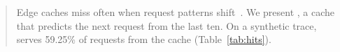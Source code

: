 \begin{abstract}
Edge caches miss often when request patterns shift~\cite{Doe2029}.
We present \examplesys{}, a cache that predicts the next request from the last ten.
On a synthetic trace, \examplesys{} serves 59.25\% of requests from the cache (Table~\ref{tab:hits}).
\end{abstract}
